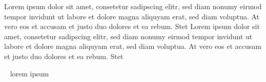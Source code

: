 Lorem ipsum dolor sit amet, consetetur sadipscing elitr, sed diam nonumy
eirmod tempor invidunt ut labore et dolore magna aliquyam erat, sed diam
voluptua. At vero eos et accusam et justo duo dolores et ea rebum. Stet
Lorem ipsum dolor sit amet, consetetur sadipscing elitr, sed diam nonumy
eirmod tempor invidunt ut labore et dolore magna aliquyam erat, sed diam
voluptua. At vero eos et accusam et justo duo dolores et ea rebum. Stet






\label{C1:discussion} %
\ %
lorem ipsum







